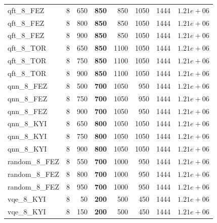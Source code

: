 \begin{table}[ht!]
\begin{tabular}{l c r r r r r r}
qft\_8\_FEZ & 8 & 650 & \textbf{850} & 850 & 1050 & 1444 & $1.21e+06$ \\
qft\_8\_FEZ & 8 & 800 & \textbf{850} & 850 & 1050 & 1444 & $1.21e+06$ \\
qft\_8\_FEZ & 8 & 900 & \textbf{850} & 850 & 1050 & 1444 & $1.21e+06$ \\
qft\_8\_TOR & 8 & 650 & \textbf{850} & 1100 & 1050 & 1444 & $1.21e+06$ \\
qft\_8\_TOR & 8 & 750 & \textbf{850} & 1100 & 1050 & 1444 & $1.21e+06$ \\
qft\_8\_TOR & 8 & 900 & \textbf{850} & 1100 & 1050 & 1444 & $1.21e+06$ \\
qnn\_8\_FEZ & 8 & 500 & \textbf{700} & 1050 & 950 & 1444 & $1.21e+06$ \\
qnn\_8\_FEZ & 8 & 750 & \textbf{700} & 1050 & 950 & 1444 & $1.21e+06$ \\
qnn\_8\_FEZ & 8 & 900 & \textbf{700} & 1050 & 950 & 1444 & $1.21e+06$ \\
qnn\_8\_KYI & 8 & 650 & \textbf{800} & 1050 & 1050 & 1444 & $1.21e+06$ \\
qnn\_8\_KYI & 8 & 750 & \textbf{800} & 1050 & 1050 & 1444 & $1.21e+06$ \\
qnn\_8\_KYI & 8 & 900 & \textbf{800} & 1050 & 1050 & 1444 & $1.21e+06$ \\
random\_8\_FEZ & 8 & 550 & \textbf{700} & 1000 & 950 & 1444 & $1.21e+06$ \\
random\_8\_FEZ & 8 & 800 & \textbf{700} & 1000 & 950 & 1444 & $1.21e+06$ \\
random\_8\_FEZ & 8 & 950 & \textbf{700} & 1000 & 950 & 1444 & $1.21e+06$ \\
vqe\_8\_KYI & 8 & 50 & \textbf{200} & 500 & 450 & 1444 & $1.21e+06$ \\
vqe\_8\_KYI & 8 & 150 & \textbf{200} & 500 & 450 & 1444 & $1.21e+06$ \\
\bottomrule
\end{tabular}
\end{table}


